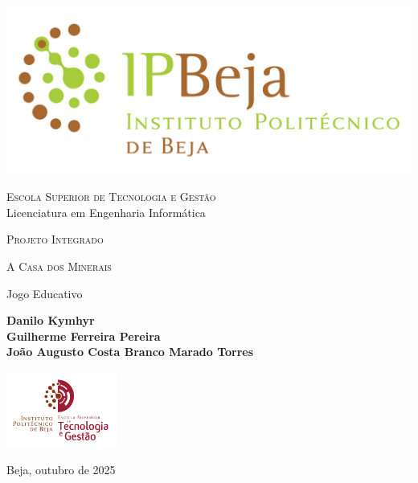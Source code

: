\documentclass[12pt,a4paper,openright,oneside]{memoir}
\newcommand{\School}{Escola Superior de Tecnologia e Gestão}
\newcommand{\Degree}{Licenciatura em Engenharia Informática}
\newcommand{\Course}{Projeto Integrado}
\newcommand{\Title}{A Casa dos Minerais}
\newcommand{\Subtitle}{Jogo Educativo}
\newcommand{\AuthorFirst}{Danilo Kymhyr}
\newcommand{\AuthorSecond}{Guilherme Ferreira Pereira}
\newcommand{\AuthorThird}{João Augusto Costa Branco Marado Torres}
\newcommand{\Date}{Beja, outubro de 2025}
\begin{document}
\thispagestyle{empty}

\begin{center}
    \includegraphics{Logotipo_IPBeja_horizontal-5/IPbeja_horizontal}

    \bigskip

    \textsc{\large \School}\\{\large \Degree}

    \bigskip

    \textsc{\large \Course}

    \vspace{4\baselineskip}

    \textsc{\Huge \Title}

    \smallskip

    {\Large \Subtitle}

    \bigskip

    {\large\bfseries \AuthorFirst}\\
    {\large\bfseries \AuthorSecond}\\
    {\large\bfseries \AuthorThird}

    \vfill

    \begin{center}
        \includegraphics[height=25mm,keepaspectratio]{Logotipos_ESTIG/estig}%
    \end{center}

    \vfill

    {\footnotesize \Date}
\end{center}

\cleardoublepage
\end{document}
